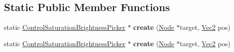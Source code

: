 \subsection*{Static Public Member Functions}
\begin{DoxyCompactItemize}
\item 
\mbox{\label{classControlSaturationBrightnessPicker_a7d313497a7c680baa59a65d474506fb4}} 
static \hyperlink{classControlSaturationBrightnessPicker}{Control\+Saturation\+Brightness\+Picker} $\ast$ {\bfseries create} (\hyperlink{classNode}{Node} $\ast$target, \hyperlink{classVec2}{Vec2} pos)
\item 
\mbox{\label{classControlSaturationBrightnessPicker_a8b14a06cbe4ff9c7618d2d7a5d12426f}} 
static \hyperlink{classControlSaturationBrightnessPicker}{Control\+Saturation\+Brightness\+Picker} $\ast$ {\bfseries create} (\hyperlink{classNode}{Node} $\ast$target, \hyperlink{classVec2}{Vec2} pos)
\end{DoxyCompactItemize}
